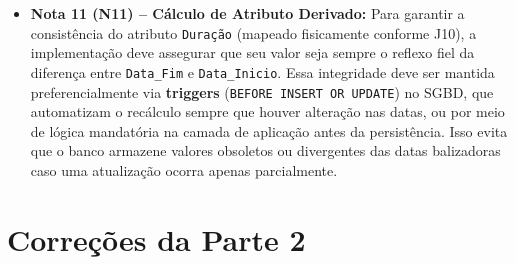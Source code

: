 \documentclass[12pt]{article}
\begin{document}
\begin{itemize}
    \item \textbf{Nota 11 (N11) -- Cálculo de Atributo Derivado:}
    Para garantir a consistência do atributo \texttt{Duração} (mapeado fisicamente conforme J10), a implementação deve assegurar que seu valor seja sempre o reflexo fiel da diferença entre \texttt{Data\_Fim} e \texttt{Data\_Inicio}. Essa integridade deve ser mantida preferencialmente via \textbf{triggers} (\texttt{BEFORE INSERT OR UPDATE}) no SGBD, que automatizam o recálculo sempre que houver alteração nas datas, ou por meio de lógica mandatória na camada de aplicação antes da persistência. Isso evita que o banco armazene valores obsoletos ou divergentes das datas balizadoras caso uma atualização ocorra apenas parcialmente.

\end{itemize}

\section{Correções da Parte 2}
\end{document}
